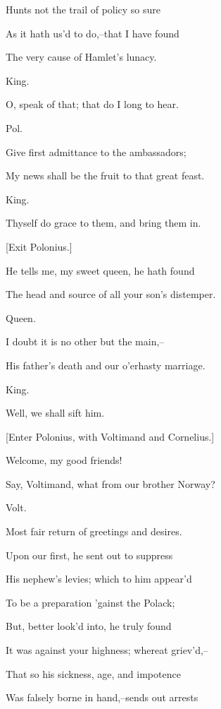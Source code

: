 \documentclass[12pt]{book}
\begin{document}
Hunts not the trail of policy so sure

As it hath us'd to do,--that I have found

The very cause of Hamlet's lunacy.



King.

O, speak of that; that do I long to hear.



Pol.

Give first admittance to the ambassadors;

My news shall be the fruit to that great feast.



King.

Thyself do grace to them, and bring them in.



[Exit Polonius.]



He tells me, my sweet queen, he hath found

The head and source of all your son's distemper.



Queen.

I doubt it is no other but the main,--

His father's death and our o'erhasty marriage.



King.

Well, we shall sift him.



[Enter Polonius, with Voltimand and Cornelius.]



Welcome, my good friends!

Say, Voltimand, what from our brother Norway?



Volt.

Most fair return of greetings and desires.

Upon our first, he sent out to suppress

His nephew's levies; which to him appear'd

To be a preparation 'gainst the Polack;

But, better look'd into, he truly found

It was against your highness; whereat griev'd,--

That so his sickness, age, and impotence

Was falsely borne in hand,--sends out arrests
\end{document}
